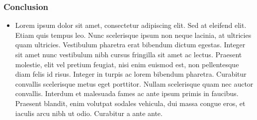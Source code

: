 \begin{frame}
    \frametitle{\checkmark \hspace{1mm} Conclusion}
    \begin{itemize}
        \item Lorem ipsum dolor sit amet, consectetur adipiscing elit. Sed at
        eleifend elit. Etiam quis tempus leo. Nunc scelerisque ipsum non neque
        lacinia, at ultricies quam ultricies. Vestibulum pharetra erat bibendum
        dictum egestas. Integer sit amet nunc vestibulum nibh cursus fringilla
        sit amet ac lectus. Praesent molestie, elit vel pretium feugiat, nisi
        enim euismod est, non pellentesque diam felis id risus. Integer in
        turpis ac lorem bibendum pharetra. Curabitur convallis scelerisque metus
        eget porttitor. Nullam scelerisque quam nec auctor convallis. Interdum
        et malesuada fames ac ante ipsum primis in faucibus. Praesent blandit,
        enim volutpat sodales vehicula, dui massa congue eros, et iaculis arcu
        nibh ut odio. Curabitur a ante ante. 
    \end{itemize}
\end{frame}